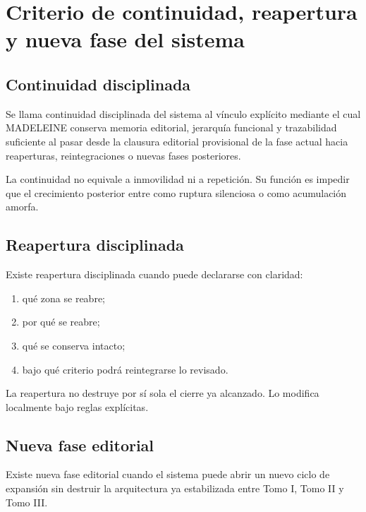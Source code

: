 \chapter{Criterio de continuidad, reapertura y nueva fase del sistema}

\section{Continuidad disciplinada}
\begin{definition}
Se llama continuidad disciplinada del sistema al vínculo explícito mediante el cual MADELEINE conserva memoria editorial, jerarquía funcional y trazabilidad suficiente al pasar desde la clausura editorial provisional de la fase actual hacia reaperturas, reintegraciones o nuevas fases posteriores.
\end{definition}

\begin{observation}
La continuidad no equivale a inmovilidad ni a repetición. Su función es impedir que el crecimiento posterior entre como ruptura silenciosa o como acumulación amorfa.
\end{observation}

\section{Reapertura disciplinada}
\begin{definition}
Existe reapertura disciplinada cuando puede declararse con claridad:
\begin{enumerate}
  \item qué zona se reabre;
  \item por qué se reabre;
  \item qué se conserva intacto;
  \item bajo qué criterio podrá reintegrarse lo revisado.
\end{enumerate}
\end{definition}

\begin{observation}
La reapertura no destruye por sí sola el cierre ya alcanzado. Lo modifica localmente bajo reglas explícitas.
\end{observation}

\section{Nueva fase editorial}
\begin{definition}
Existe nueva fase editorial cuando el sistema puede abrir un nuevo ciclo de expansión sin destruir la arquitectura ya estabilizada entre Tomo I, Tomo II y Tomo III.
\end{definition}

